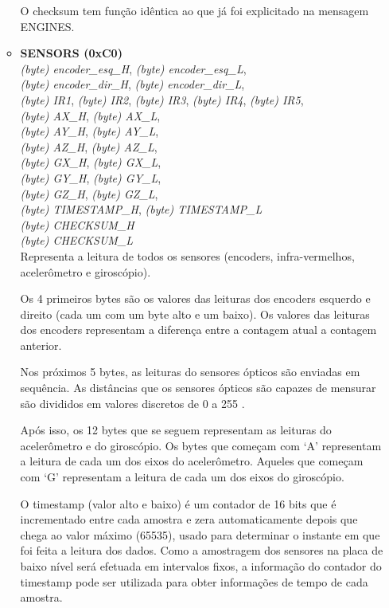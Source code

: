 \begin{itemize}
\begin{itemize}
	  O checksum tem função idêntica ao que já foi explicitado na mensagem ENGINES.
	  
	  \item \textbf{SENSORS (0xC0)}\\
	  \textit{(byte) encoder\_esq\_H}, \textit{(byte) encoder\_esq\_L},\\
	  \textit{(byte) encoder\_dir\_H}, \textit{(byte) encoder\_dir\_L},\\
	  \textit{(byte) IR1}, \textit{(byte) IR2}, \textit{(byte) IR3}, \textit{(byte) IR4}, \textit{(byte) IR5},\\
	  \textit{(byte) AX\_H}, \textit{(byte) AX\_L},\\
	  \textit{(byte) AY\_H}, \textit{(byte) AY\_L},\\
	  \textit{(byte) AZ\_H}, \textit{(byte) AZ\_L},\\
	  \textit{(byte) GX\_H}, \textit{(byte) GX\_L},\\
	  \textit{(byte) GY\_H}, \textit{(byte) GY\_L},\\
	  \textit{(byte) GZ\_H}, \textit{(byte) GZ\_L},\\
	  \textit{(byte) TIMESTAMP\_H}, \textit{(byte) TIMESTAMP\_L}\\
	  \textit{(byte) CHECKSUM\_H}\\
	  \textit{(byte) CHECKSUM\_L}\\
	  Representa a leitura de todos os sensores (encoders, infra-vermelhos, acelerômetro e giroscópio). 
	  
	  Os 4 primeiros bytes são os valores das leituras dos encoders esquerdo e direito (cada um com um byte alto e um baixo). Os valores das leituras dos encoders representam a diferença entre a contagem atual a contagem anterior.
	  
	  Nos próximos 5 bytes, as leituras do sensores ópticos são enviadas em sequência. As distâncias que os sensores ópticos são capazes de mensurar são divididos em valores discretos de 0 a 255 \cite{bellator_2012}. 
	  
	  Após isso, os 12 bytes que se seguem representam as leituras do acelerômetro e do giroscópio. Os bytes que começam com `A' representam a leitura de cada um dos eixos do acelerômetro. Aqueles que começam com `G' representam a leitura de cada um dos eixos do giroscópio.
	  
	  O timestamp (valor alto e baixo) é um contador de 16 bits que é incrementado entre cada amostra e zera automaticamente depois que chega ao valor máximo (65535), usado para determinar o instante em que foi feita a leitura dos dados. Como a amostragem dos sensores na placa de baixo nível será efetuada em intervalos fixos, a informação do contador do timestamp pode ser utilizada para obter informações de tempo de cada amostra.


\end{itemize}
\end{itemize}
